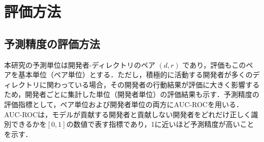 \documentclass[submit]{ipsj}
\begin{document}
\section{評価方法}\label{sec:evaluation}

\subsection{予測精度の評価方法}
本研究の予測単位は開発者-ディレクトリのペア $(d, r)$ であり，評価もこのペアを基本単位（ペア単位）とする．ただし，積極的に活動する開発者が多くのディレクトリに関わっている場合，その開発者の行動結果が評価に大きく影響するため，開発者ごとに集計した単位（開発者単位）の評価結果も示す．予測精度の評価指標として，ペア単位および開発者単位の両方にAUC-ROCを用いる．AUC-ROCは，モデルが貢献する開発者と貢献しない開発者をどれだけ正しく識別できるかを$[0, 1]$の数値で表す指標であり，1に近いほど予測精度が高いことを示す．









\end{document}
